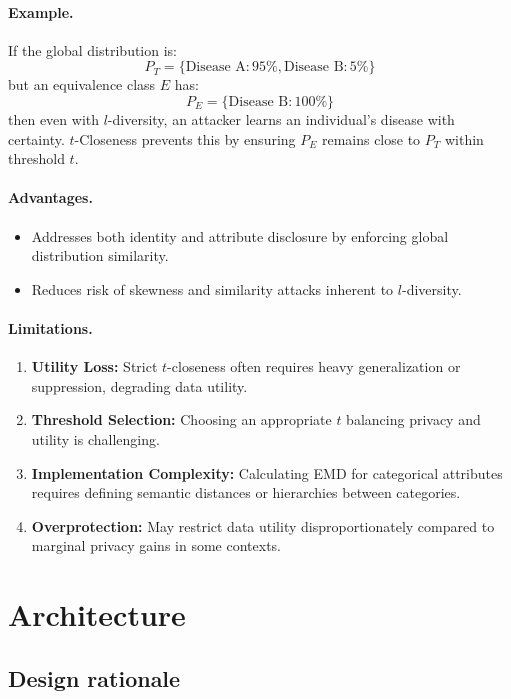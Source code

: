 \documentclass{article}
\begin{document}
\paragraph{Example.}
If the global distribution is:
\[
P_T = \{ \text{Disease A}: 95\%, \text{Disease B}: 5\% \}
\]
but an equivalence class $E$ has:
\[
P_E = \{ \text{Disease B}: 100\% \}
\]
then even with $l$-diversity, an attacker learns an individual's disease with certainty. $t$-Closeness prevents this by ensuring $P_E$ remains close to $P_T$ within threshold $t$.

\paragraph{Advantages.}
\begin{itemize}
    \item Addresses both identity and attribute disclosure by enforcing global distribution similarity.
    \item Reduces risk of skewness and similarity attacks inherent to $l$-diversity.
\end{itemize}

\paragraph{Limitations.}
\begin{enumerate}
    \item \textbf{Utility Loss:} Strict $t$-closeness often requires heavy generalization or suppression, degrading data utility.
    \item \textbf{Threshold Selection:} Choosing an appropriate $t$ balancing privacy and utility is challenging.
    \item \textbf{Implementation Complexity:} Calculating EMD for categorical attributes requires defining semantic distances or hierarchies between categories.
    \item \textbf{Overprotection:} May restrict data utility disproportionately compared to marginal privacy gains in some contexts.
\end{enumerate}


\section{Architecture}
\label{sec:architecture}

\subsection{Design rationale}
\end{document}
